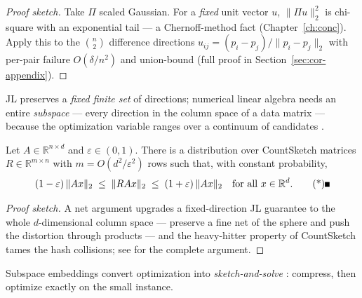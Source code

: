 \begin{proof}[Proof sketch]
Take $\Pi$ scaled Gaussian. For a \emph{fixed} unit vector $u$,
$\|\Pi u\|_2^2$ is chi-square with an exponential tail --- a
Chernoff-method fact (Chapter~\ref{ch:conc}). Apply this to the
$\binom{n}{2}$ difference directions $u_{ij} = (p_i -
p_j)/\|p_i - p_j\|_2$ with per-pair failure $O(\delta/n^2)$ and
union-bound (full proof in Section~\ref{sec:cor-appendix}).
\end{proof}


JL preserves a \emph{fixed finite set} of directions; numerical linear
algebra needs an entire \emph{subspace} --- every direction in the
column space of a data matrix --- because the optimization variable
ranges over a continuum of candidates
\citep{coresets-rnla-bg4,coresets-rnla-bg6}.

\begin{theorem}\label{thm:cor-embed}
Let $A \in \mathbb{R}^{n \times d}$ and $\varepsilon \in (0,1)$. There
is a distribution over CountSketch matrices $R \in \mathbb{R}^{m \times
n}$ with $m = O(d^2/\varepsilon^2)$ rows such that, with constant
probability,
\[
(1-\varepsilon)\,\|Ax\|_2 \;\le\; \|R A x\|_2 \;\le\;
(1+\varepsilon)\,\|A x\|_2
\quad\text{for all } x \in \mathbb{R}^d. \eopm
\]
\end{theorem}

\begin{proof}[Proof sketch]
A net argument upgrades a fixed-direction JL guarantee to the whole
$d$-dimensional column space --- preserve a fine net of the sphere and
push the distortion through products --- and the heavy-hitter property
of CountSketch tames the hash collisions; see
\citep{coresets-rnla-bg5,coresets-rnla-bg6} for the complete argument.
\end{proof}

Subspace embeddings convert optimization into \emph{sketch-and-solve}
\citep{coresets-rnla-bg4}: compress, then optimize exactly on the small
instance.


